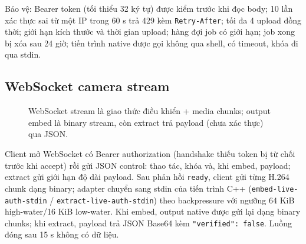 \documentclass[11pt,a4paper]{article}
\renewcommand{\_}{\origunderscore\allowbreak}
\begin{document}
Bảo vệ: Bearer token (tối thiểu 32 ký tự) được kiểm trước khi đọc body; 10 lần xác thực sai từ một IP trong 60 s trả 429 kèm \texttt{Retry-After}; tối đa 4 upload đồng thời; giới hạn kích thước và thời gian upload; hàng đợi job có giới hạn; job xong bị xóa sau 24 giờ; tiến trình native được gọi không qua shell, có timeout, khóa đi qua stdin.

\subsection{WebSocket camera stream}
\begin{figure}[H]\centering
{}
\caption{WebSocket stream là giao thức điều khiển + media chunks; output embed là binary stream, còn extract trả payload (chưa xác thực) qua JSON.}
\label{fig:ws-flow}
\end{figure}
Client mở WebSocket có Bearer authorization (handshake thiếu token bị từ chối trước khi accept) rồi gửi JSON control: thao tác, khóa và, khi embed, payload; extract gửi giới hạn độ dài payload. Sau phản hồi \texttt{ready}, client gửi từng H.264 chunk dạng binary; adapter chuyển sang stdin của tiến trình C++ (\texttt{embed-\allowbreak live-\allowbreak auth-\allowbreak stdin} / \texttt{extract-\allowbreak live-\allowbreak auth-\allowbreak stdin}) theo backpressure với ngưỡng 64 KiB high-water/16 KiB low-water. Khi embed, output native được gửi lại dạng binary chunks; khi extract, payload trả JSON Base64 kèm \texttt{"verified": false}. Luồng đóng sau 15 s không có dữ liệu.
\end{document}

